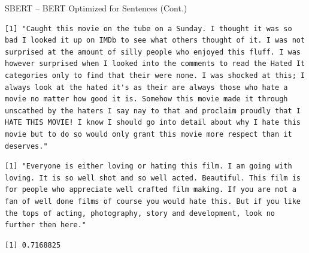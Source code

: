 \documentclass[
  ignorenonframetext,
  aspectratio=169]{beamer}
\newenvironment{Shaded}{\begin{snugshade}}{\end{snugshade}}
\newcommand{\AttributeTok}[1]{\textcolor[rgb]{0.13,0.29,0.53}{#1}}
\newcommand{\CommentTok}[1]{\textcolor[rgb]{0.56,0.35,0.01}{\textit{#1}}}
\newcommand{\DecValTok}[1]{\textcolor[rgb]{0.00,0.00,0.81}{#1}}
\newcommand{\FunctionTok}[1]{\textcolor[rgb]{0.13,0.29,0.53}{\textbf{#1}}}
\newcommand{\NormalTok}[1]{#1}
\newcommand{\OtherTok}[1]{\textcolor[rgb]{0.56,0.35,0.01}{#1}}
\newcommand{\SpecialCharTok}[1]{\textcolor[rgb]{0.81,0.36,0.00}{\textbf{#1}}}
\begin{document}
\begin{frame}[fragile]{SBERT -- BERT Optimized for Sentences (Cont.)}
\label{sbert-bert-optimized-for-sentences-cont.-2}
\scriptsize

\begin{Shaded}
\end{Shaded}

\begin{verbatim}
[1] "Caught this movie on the tube on a Sunday. I thought it was so bad I looked it up on IMDb to see what others thought of it. I was not surprised at the amount of silly people who enjoyed this fluff. I was however surprised when I looked into the comments to read the Hated It categories only to find that their were none. I was shocked at this; I always look at the hated it's as their are always those who hate a movie no matter how good it is. Somehow this movie made it through unscathed by the haters I say nay to that and proclaim proudly that I HATE THIS MOVIE! I know I should go into detail about why I hate this movie but to do so would only grant this movie more respect than it deserves."
\end{verbatim}

\begin{Shaded}
\end{Shaded}

\begin{verbatim}
[1] "Everyone is either loving or hating this film. I am going with loving. It is so well shot and so well acted. Beautiful. This film is for people who appreciate well crafted film making. If you are not a fan of well done films of course you would hate this. But if you like the tops of acting, photography, story and development, look no further then here."
\end{verbatim}

\begin{Shaded}
\end{Shaded}

\begin{verbatim}
[1] 0.7168825
\end{verbatim}
\end{frame}
\end{document}
